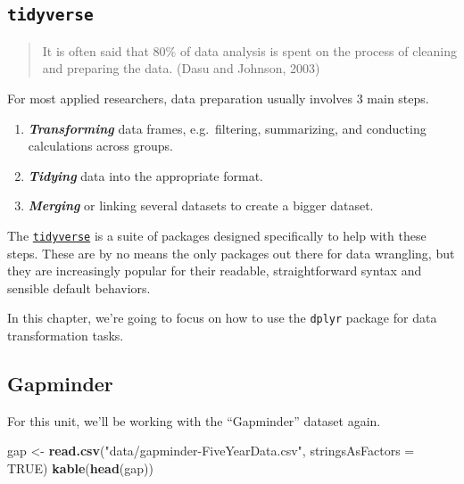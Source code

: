 \documentclass[]{book}
\newenvironment{Shaded}{\begin{snugshade}}{\end{snugshade}}
\newcommand{\DataTypeTok}[1]{\textcolor[rgb]{0.13,0.29,0.53}{#1}}
\newcommand{\KeywordTok}[1]{\textcolor[rgb]{0.13,0.29,0.53}{\textbf{#1}}}
\newcommand{\NormalTok}[1]{#1}
\newcommand{\OtherTok}[1]{\textcolor[rgb]{0.56,0.35,0.01}{#1}}
\newcommand{\StringTok}[1]{\textcolor[rgb]{0.31,0.60,0.02}{#1}}
\providecommand{\tightlist}{%
  \setlength{\itemsep}{0pt}\setlength{\parskip}{0pt}}
\begin{document}
\hypertarget{tidyverse}{%
\subsection{\texorpdfstring{\texttt{tidyverse}}{tidyverse}}\label{tidyverse}}

\begin{quote}
It is often said that 80\% of data analysis is spent on the process of cleaning and preparing the data. (Dasu and Johnson, 2003)
\end{quote}

For most applied researchers, data preparation usually involves 3 main steps.

\begin{enumerate}
\def\labelenumi{\arabic{enumi}.}
\tightlist
\item
  \textbf{\emph{Transforming}} data frames, e.g.~filtering, summarizing, and conducting calculations across groups.
\item
  \textbf{\emph{Tidying}} data into the appropriate format.
\item
  \textbf{\emph{Merging}} or linking several datasets to create a bigger dataset.
\end{enumerate}

The \href{https://www.tidyverse.org/}{\texttt{tidyverse}} is a suite of packages designed specifically to help with these steps. These are by no means the only packages out there for data wrangling, but they are increasingly popular for their readable, straightforward syntax and sensible default behaviors.

In this chapter, we're going to focus on how to use the \texttt{dplyr} package for data transformation tasks.

\hypertarget{gapminder}{%
\subsection{Gapminder}\label{gapminder}}

For this unit, we'll be working with the ``Gapminder'' dataset again.

\begin{Shaded}
\begin{Highlighting}[]
\NormalTok{gap <-}\StringTok{ }\KeywordTok{read.csv}\NormalTok{(}\StringTok{"data/gapminder-FiveYearData.csv"}\NormalTok{, }\DataTypeTok{stringsAsFactors =} \OtherTok{TRUE}\NormalTok{)}
\KeywordTok{kable}\NormalTok{(}\KeywordTok{head}\NormalTok{(gap))}
\end{Highlighting}
\end{Shaded}
\end{document}
